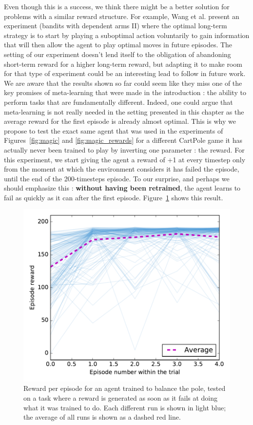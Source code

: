 Even though this is a success, we think there might be a better solution for
problems with a similar reward structure. For example, Wang et al.
\cite{learningtorl} present an experiment (bandits with dependent arms II) 
where the optimal long-term strategy is to start by playing a suboptimal action
voluntarily to gain information that will then allow the agent to play
optimal moves in future episodes. The setting of our experiment doesn't lend
itself to the obligation of abandoning short-term reward for a higher long-term
reward, but adapting it to make room for that type of experiment could be
an interesting lead to follow in future work.\\

We are aware that the results shown so far could seem like they miss one 
of the key promises of meta-learning that were made in the introduction :
the ability to perform tasks that are fundamentally different. Indeed,
one could argue that meta-learning is not really needed in the setting
presented in this chapter as the average reward for the first episode is 
already almost optimal. This is why we propose to test the exact same agent
that was used in the experiments of Figures~\ref{fig:magic} and 
\ref{fig:magic_rewards} for a different CartPole game it has 
actually never been trained to play by inverting one parameter : the reward.
For this experiment, we start giving the agent a reward of +1 at every timestep
only from the moment at which the environment considers it has failed the
episode, until the end of the 200-timesteps episode. 
To our surprise, and perhaps we should emphasize this : 
\textbf{without having been retrained}, the agent learns to fail as quickly
as it can after the first episode. Figure~\ref{fig:magic_magic} shows this
result.

\newpage

\begin{figure}[H]
	\centering
	\includegraphics[width=0.8\linewidth]{fig/magic_magic.pdf}
	\caption{Reward per episode for an agent trained to balance the pole,
	tested on a task where a reward is generated as soon as it fails at
	doing what it was trained to do. Each different run is shown in light
	blue; the average of all runs is shown as a dashed red line.}
	\label{fig:magic_magic}
\end{figure}

